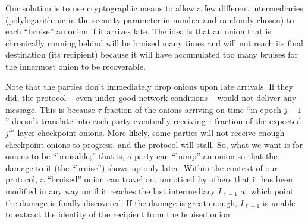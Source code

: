 \documentclass[runningheads,a4paper]{llncs}
\begin{document}
Our solution is to use cryptographic means to allow a few different intermediaries (polylogarithmic in the security parameter in number and randomly chosen) to each ``bruise'' an onion if it arrives late. The idea is that an onion that is chronically running behind will be bruised many times and will not reach its final destination (its recipient) because it will have accumulated too many bruises for the innermost onion to be recoverable. 

Note that the parties don't immediately drop onions upon late arrivals. If they did, the protocol -- even under good network conditions -- would not deliver any message. This is because $\tau$ fraction of the onions arriving on time ``in epoch $j-1$'' doesn't translate into each party eventually receiving $\tau$ fraction of the expected $j^{th}$ layer checkpoint onions. More likely, some parties will not receive enough checkpoint onions to progress, and the protocol will stall. So, what we want is for onions to be ``bruisable;'' that is, a party can ``bump'' an onion so that the damage to it (the ``bruise'') shows up only later. Within the context of our protocol, a ``bruised'' onion can travel on, unnoticed by others that it has been modified in any way until it reaches the last intermediary $I_{\ell-1}$ at which point the damage is finally discovered. If the damage is great enough, $I_{\ell-1}$ is unable to extract the identity of the recipient from the bruised onion. 
\end{document}

